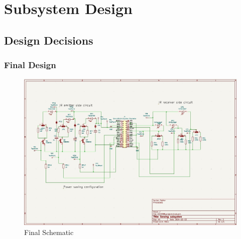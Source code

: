 \documentclass[class=report,11pt,crop=false]{standalone}
\begin{document}
\chapter{Subsystem Design} \label{ch:design}
\vspace{-1cm}
\section{Design Decisions}


\subsection{Final Design}
\begin{figure}[htbp]
    \centering
    \includegraphics[width=1.1\linewidth]{EEE3088F_final_report_latex_template-2//Figures/Final_Schematic_4.jpg}
    \caption{Final Schematic}
    \label{fig:schematic}
\end{figure}
\end{document}
